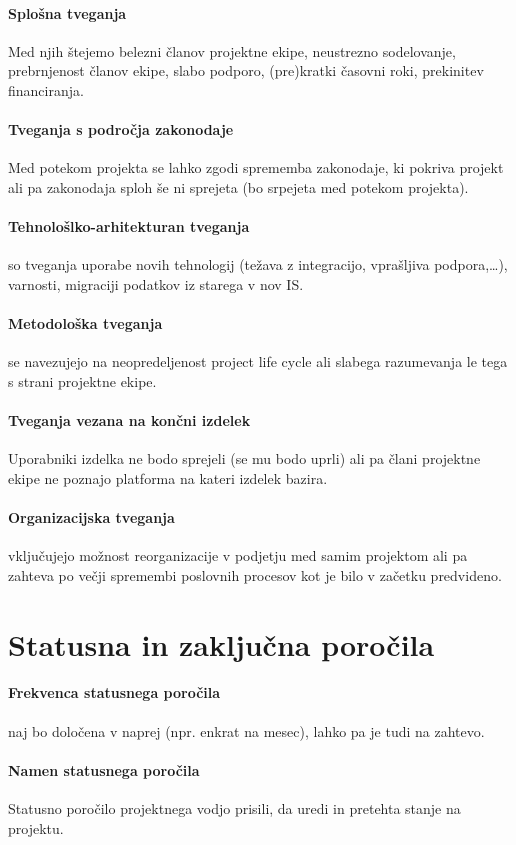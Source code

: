 \documentclass[a4paper,12pt]{report}
\begin{document}
         \paragraph{Splošna tveganja} Med njih štejemo belezni članov projektne ekipe, neustrezno sodelovanje, prebrnjenost članov ekipe, slabo podporo, (pre)kratki časovni roki, prekinitev financiranja.
         \paragraph{Tveganja s področja zakonodaje} Med potekom projekta se lahko zgodi sprememba zakonodaje, ki pokriva projekt ali pa zakonodaja sploh še ni sprejeta (bo srpejeta med potekom projekta).
         \paragraph{Tehnološlko-arhitekturan tveganja} so tveganja uporabe novih tehnologij (težava z integracijo, vprašljiva podpora,\dots), varnosti, migraciji podatkov iz starega v nov IS.
         \paragraph{Metodološka tveganja} se navezujejo na neopredeljenost project life cycle ali slabega razumevanja le tega s strani projektne ekipe.
         \paragraph{Tveganja vezana na končni izdelek} Uporabniki izdelka ne bodo sprejeli (se mu bodo uprli) ali pa člani projektne ekipe ne poznajo platforma na kateri izdelek bazira.
         \paragraph{Organizacijska tveganja} vključujejo možnost reorganizacije v podjetju med samim projektom ali pa zahteva po večji spremembi poslovnih procesov kot je bilo v začetku predvideno.
   \section{Statusna in zaključna poročila}
      \paragraph{Frekvenca statusnega poročila} naj bo določena v naprej (npr. enkrat na mesec), lahko pa je tudi na zahtevo.
      \paragraph{Namen statusnega poročila} Statusno poročilo projektnega vodjo prisili, da uredi in pretehta stanje na projektu.
\end{document}
